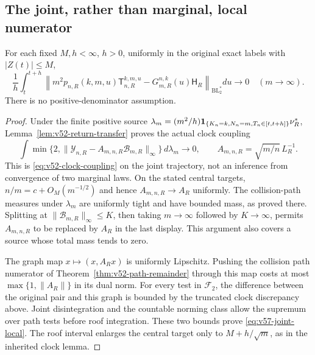 \subsection{The joint, rather than marginal, local numerator}
\begin{lemma}
\label{lem:v57-joint-local}
For each fixed $M,h<\infty$, $h>0$, uniformly in the original exact
labels with $|Z(t)|\le M$,
\begin{equation}\label{eq:v57-joint-local}
 \frac1h\int_t^{t+h}
 \left\|m^2p_{n,R}(k,m,u)\mathsf T_{n,R}^{k,m,u}
          -G_{m,R}^{n,k}(u)\mathsf H_R\right\|_{\mathrm{BL}_2^*}
                                      du\longrightarrow0
                                      \quad(m\to\infty).
\end{equation}
There is no positive-denominator assumption.
\end{lemma}
\begin{proof}
Under the finite positive source
$\lambda_m=(m^2/h)\mathbf1_{\{K_n=k,N_n=m,T_n\in[t,t+h]\}}\nu_R^*$,
Lemma~\ref{lem:v52-return-transfer} proves the actual clock coupling
\[
 \int\min\{2,\|\mathcal Y_{n,R}
       -A_{m,n,R}\mathcal B_{m,R}\|_\infty\}\,d\lambda_m\to0,
 \qquad A_{m,n,R}=\sqrt{m/n}\,L_R^{-1}.
\]
This is \eqref{eq:v52-clock-coupling} on the joint trajectory, not
an inference from convergence of two marginal laws. On the stated
central targets, $n/m=c+O_M(m^{-1/2})$ and hence
$A_{m,n,R}\to A_R$ uniformly. The collision-path measures under
$\lambda_m$ are uniformly tight and have bounded mass, as proved
there. Splitting at $\|\mathcal B_{m,R}\|_\infty\le K$, then taking
$m\to\infty$ followed by $K\to\infty$, permits $A_{m,n,R}$ to be
replaced by $A_R$ in the last display. This argument also covers a
source whose total mass tends to zero.

The graph map $x\mapsto(x,A_Rx)$ is uniformly Lipschitz. Pushing the
collision path numerator of Theorem~\ref{thm:v52-path-remainder}
through this map costs at most $\max\{1,\|A_R\|\}$ in its dual norm.
For every test in $\mathcal F_2$, the difference between the original
pair and this graph is bounded by the truncated clock discrepancy
above. Joint disintegration and the countable norming class allow the
supremum over path tests before roof integration. These two bounds
prove \eqref{eq:v57-joint-local}. The roof interval enlarges the
central target only to $M+h/\sqrt m$, as in the inherited clock lemma.
\end{proof}

